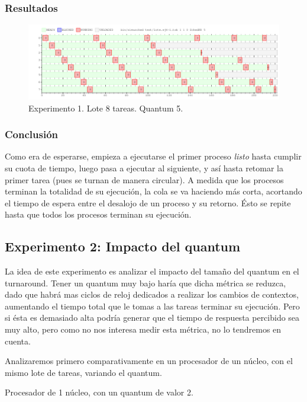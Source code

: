 \documentclass[a4paper]{article}
\begin{document}
\subsubsection{Resultados}
\begin{figure}[htb]
\begin{center}
\includegraphics[scale=0.4]{imagenes/ej4-1.png}
\end{center}
\caption{Experimento 1. Lote 8 tareas. Quantum 5.}
\end{figure}

\subsubsection{Conclusión}
Como era de esperarse, empieza a ejecutarse el primer proceso \textit{listo}
hasta cumplir su cuota de tiempo, luego pasa a ejecutar al siguiente, y así
hasta retomar la primer tarea (pues se turnan de manera circular). A medida
que los procesos terminan la totalidad de su ejecución, la cola se va haciendo más corta,
acortando el tiempo de espera entre el desalojo de un proceso y su retorno.
Ésto se repite hasta que todos los procesos terminan su ejecución.

\subsection{Experimento 2: Impacto del quantum}
La idea de este experimento es analizar el impacto del tamaño del quantum en el turnaround. Tener un quantum muy bajo haría que dicha métrica se reduzca,
dado que habrá mas ciclos de reloj dedicados a realizar los cambios de
contextos, aumentando el tiempo total que le tomas a las tareas terminar su
ejecución. Pero si ésta es demasiado alta podría generar que el tiempo de
respuesta percibido sea muy alto, pero como no nos interesa medir esta
métrica, no lo tendremos en cuenta.

Analizaremos primero comparativamente en un procesador de un núcleo, con el
mismo lote de tareas, variando el quantum.

Procesador de 1 núcleo, con un quantum de valor 2.
\end{document}
